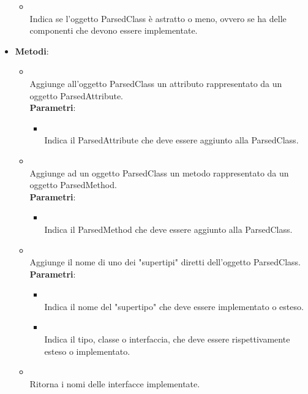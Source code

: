 \begin{itemize}
\begin{itemize}
\item {}
\\ Indica se l'oggetto ParsedClass è astratto o meno, ovvero se ha delle componenti che devono essere implementate.
\end{itemize}
\item \textbf{Metodi}:
\begin{itemize}
\item {}
\\ Aggiunge all'oggetto ParsedClass un attributo rappresentato da un oggetto ParsedAttribute.
\\ \textbf{Parametri}:
\begin{itemize}
\item {}
\\ Indica il ParsedAttribute che deve essere aggiunto alla ParsedClass.
\end{itemize}
\item {}
\\ Aggiunge ad un oggetto ParsedClass un metodo rappresentato da un oggetto ParsedMethod.
\\ \textbf{Parametri}:
\begin{itemize}
\item {}
\\ Indica il ParsedMethod che deve essere aggiunto alla ParsedClass.
\end{itemize}
\item {}
\\ Aggiunge il nome di uno dei "supertipi" diretti dell'oggetto ParsedClass.
\\ \textbf{Parametri}:
\begin{itemize}
\item {}
\\ Indica il nome del "supertipo" che deve essere implementato o esteso.
\item {}
\\ Indica il tipo, classe o interfaccia, che deve essere rispettivamente esteso o implementato.
\end{itemize}
\item {}
\\ Ritorna i nomi delle interfacce implementate.

\end{itemize}
\end{itemize}
